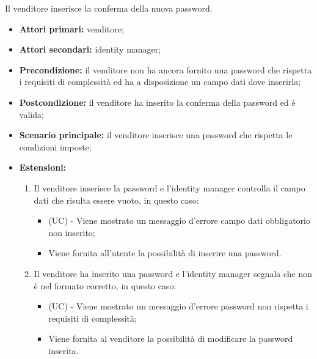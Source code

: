 Il venditore inserisce la conferma della nuova password.
\begin{itemize}
	\item \textbf{Attori primari:} venditore;
	\item \textbf{Attori secondari:} identity manager;
	\item \textbf{Precondizione:} il venditore non ha ancora fornito una password che rispetta i requisiti di complessità ed ha a disposizione un campo dati dove inserirla;
	\item \textbf{Postcondizione:} il venditore ha inserito la conferma della password ed è valida;
	\item \textbf{Scenario principale:} il venditore inserisce una password che rispetta le condizioni imposte;
	\item \textbf{Estensioni:}
	\begin{enumerate}[label=\lett]
		\item Il venditore inserisce la password e l'identity manager controlla il campo dati che risulta essere vuoto, in questo caso:
		\begin{itemize}
			\item (UC) - Viene mostrato un messaggio d'errore campo dati obbligatorio non inserito;
			\item Viene fornita all'utente la possibilità di inserire una password.
		\end{itemize}
		\item Il venditore ha inserito una password e l'identity manager segnala che non è nel formato corretto, in questo caso:
		\begin{itemize}
			\item (UC) - Viene mostrato un messaggio d'errore password non rispetta i requisiti di complessità;
			\item Viene fornita al venditore la possibilità di modificare la password inserita.
		\end{itemize}
	\end{enumerate} 
\end{itemize}

